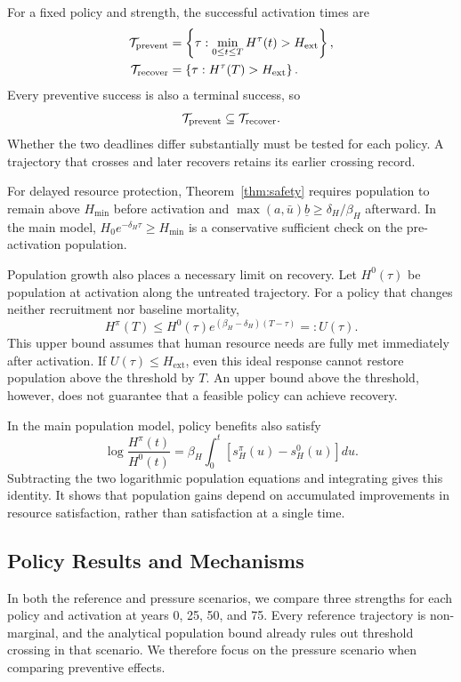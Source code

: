 \documentclass[12pt,a4paper]{article}
\theoremstyle{remark}
\newcommand{\Hext}{H_{\mathrm{ext}}}
\newcommand{\Hmin}{H_{\min}}
\begin{document}
For a fixed policy and strength, the successful activation times are
\begin{align}
\mathcal T_{\rm prevent}&=\left\{\tau:\min_{0\le t\le T}H^\tau(t)>\Hext\right\},\\
\mathcal T_{\rm recover}&=\left\{\tau:H^\tau(T)>\Hext\right\}.\label{eq:timingsets}
\end{align}
Every preventive success is also a terminal success, so
\[
\mathcal T_{\rm prevent}\subseteq\mathcal T_{\rm recover}.
\]
Whether the two deadlines differ substantially must be tested for each policy. A trajectory that crosses and later recovers retains its earlier crossing record.

For delayed resource protection, Theorem~\ref{thm:safety} requires population to remain above $\Hmin$ before activation and $\max(a,\bar u)\underline b\ge\delta_H/\beta_H$ afterward. In the main model, $H_0e^{-\delta_H\tau}\ge\Hmin$ is a conservative sufficient check on the pre-activation population.

Population growth also places a necessary limit on recovery. Let $H^0(\tau)$ be population at activation along the untreated trajectory. For a policy that changes neither recruitment nor baseline mortality,
\begin{equation}\label{eq:envelope}
H^\pi(T)\le H^0(\tau)e^{(\beta_H-\delta_H)(T-\tau)}=:U(\tau).
\end{equation}
This upper bound assumes that human resource needs are fully met immediately after activation. If $U(\tau)\le\Hext$, even this ideal response cannot restore population above the threshold by $T$. An upper bound above the threshold, however, does not guarantee that a feasible policy can achieve recovery.

In the main population model, policy benefits also satisfy
\begin{equation}\label{eq:identity}
\log\frac{H^\pi(t)}{H^0(t)}
=\beta_H\int_0^t\left[s_H^\pi(u)-s_H^0(u)\right]du.
\end{equation}
Subtracting the two logarithmic population equations and integrating gives this identity. It shows that population gains depend on accumulated improvements in resource satisfaction, rather than satisfaction at a single time.

\subsection{Policy Results and Mechanisms}
In both the reference and pressure scenarios, we compare three strengths for each policy and activation at years 0, 25, 50, and 75. Every reference trajectory is non-marginal, and the analytical population bound already rules out threshold crossing in that scenario. We therefore focus on the pressure scenario when comparing preventive effects.
\end{document}
